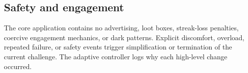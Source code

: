 \subsection{Safety and engagement}

The core application contains no advertising, loot boxes, streak-loss penalties, coercive engagement mechanics, or dark patterns. Explicit discomfort, overload, repeated failure, or safety events trigger simplification or termination of the current challenge. The adaptive controller logs why each high-level change occurred.
